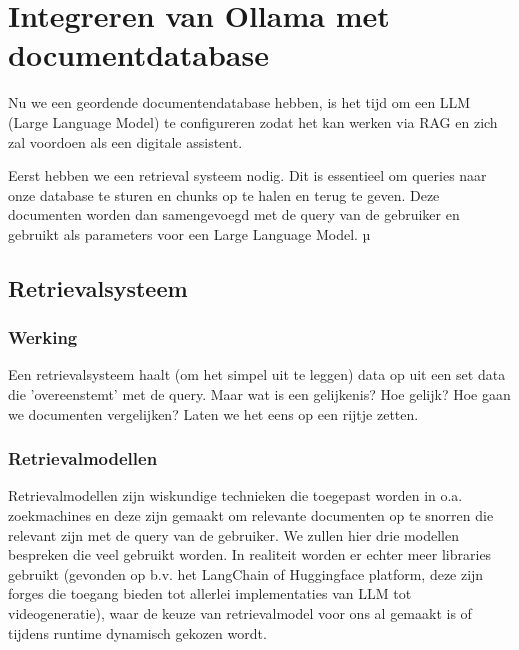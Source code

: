 \chapter{Integreren van Ollama met documentdatabase}

Nu we een geordende documentendatabase hebben, is het tijd om een LLM (Large Language Model) te configureren zodat het kan werken via RAG en zich zal voordoen als een digitale assistent.

Eerst hebben we een retrieval systeem nodig.
Dit is essentieel om queries naar onze database te sturen en chunks op te halen en terug te geven.
Deze documenten worden dan samengevoegd met de query van de gebruiker en gebruikt als parameters voor een Large Language Model. µ

\section{Retrievalsysteem}
\subsection{Werking}
Een retrievalsysteem haalt (om het simpel uit te leggen) data op uit een set data die 'overeenstemt' met de query.
Maar wat is een gelijkenis? Hoe gelijk?
Hoe gaan we documenten vergelijken? Laten we het eens op een rijtje zetten.

\subsection{Retrievalmodellen}
Retrievalmodellen zijn wiskundige technieken die toegepast worden in o.a. zoekmachines en deze zijn gemaakt om relevante documenten op te snorren die relevant zijn met de query van de gebruiker.
We zullen hier drie modellen bespreken die veel gebruikt worden.
In realiteit worden er echter meer libraries gebruikt (gevonden op b.v. het LangChain of Huggingface platform, deze zijn forges die toegang bieden tot allerlei implementaties van LLM tot videogeneratie),
waar de keuze van retrievalmodel voor ons al gemaakt is of tijdens runtime dynamisch gekozen wordt.

